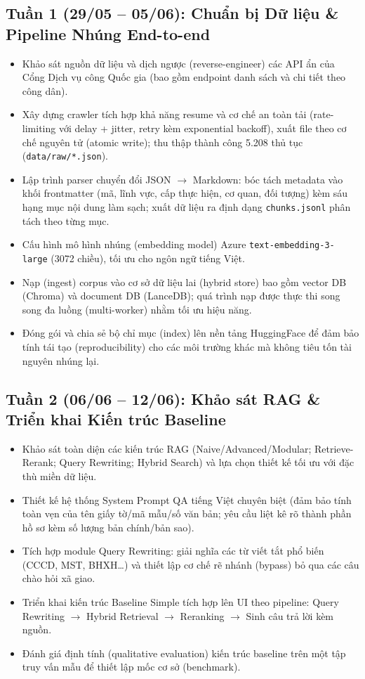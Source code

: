 \documentclass[11pt]{article}
\newcommand{\cbDone}{\item[$\boxtimes$]}
\newcommand{\cbTodo}{\item[$\square$]}
\begin{document}
\subsection{Tuần 1 (29/05 -- 05/06): Chuẩn bị Dữ liệu \& Pipeline Nhúng End-to-end}
\begin{itemize}
  \cbDone Khảo sát nguồn dữ liệu và dịch ngược (reverse-engineer) các API ẩn của Cổng Dịch vụ công Quốc gia (bao gồm endpoint danh sách và chi tiết theo công dân).
  \cbDone Xây dựng crawler tích hợp khả năng resume và cơ chế an toàn tải (rate-limiting với delay + jitter, retry kèm exponential backoff), xuất file theo cơ chế nguyên tử (atomic write); thu thập thành công 5.208 thủ tục (\texttt{data/raw/*.json}).
  \cbDone Lập trình parser chuyển đổi JSON \(\rightarrow\) Markdown: bóc tách metadata vào khối frontmatter (mã, lĩnh vực, cấp thực hiện, cơ quan, đối tượng) kèm sáu hạng mục nội dung làm sạch; xuất dữ liệu ra định dạng \texttt{chunks.jsonl} phân tách theo từng mục.
  \cbDone Cấu hình mô hình nhúng (embedding model) Azure \texttt{text-embedding-3-large} (3072 chiều), tối ưu cho ngôn ngữ tiếng Việt.
  \cbDone Nạp (ingest) corpus vào cơ sở dữ liệu lai (hybrid store) bao gồm vector DB (Chroma) và document DB (LanceDB); quá trình nạp được thực thi song song đa luồng (multi-worker) nhằm tối ưu hiệu năng.
  \cbDone Đóng gói và chia sẻ bộ chỉ mục (index) lên nền tảng HuggingFace để đảm bảo tính tái tạo (reproducibility) cho các môi trường khác mà không tiêu tốn tài nguyên nhúng lại.
\end{itemize}

\subsection{Tuần 2 (06/06 -- 12/06): Khảo sát RAG \& Triển khai Kiến trúc Baseline}
\begin{itemize}
  \cbDone Khảo sát toàn diện các kiến trúc RAG (Naive/Advanced/Modular; Retrieve-Rerank; Query Rewriting; Hybrid Search) và lựa chọn thiết kế tối ưu với đặc thù miền dữ liệu.
  \cbDone Thiết kế hệ thống System Prompt QA tiếng Việt chuyên biệt (đảm bảo tính toàn vẹn của tên giấy tờ/mã mẫu/số văn bản; yêu cầu liệt kê rõ thành phần hồ sơ kèm số lượng bản chính/bản sao).
  \cbDone Tích hợp module Query Rewriting: giải nghĩa các từ viết tắt phổ biến (CCCD, MST, BHXH\ldots) và thiết lập cơ chế rẽ nhánh (bypass) bỏ qua các câu chào hỏi xã giao.
  \cbDone Triển khai kiến trúc Baseline Simple tích hợp lên UI theo pipeline: Query Rewriting \(\rightarrow\) Hybrid Retrieval \(\rightarrow\) Reranking \(\rightarrow\) Sinh câu trả lời kèm nguồn.
  \cbTodo Đánh giá định tính (qualitative evaluation) kiến trúc baseline trên một tập truy vấn mẫu để thiết lập mốc cơ sở (benchmark).
\end{itemize}
\end{document}
